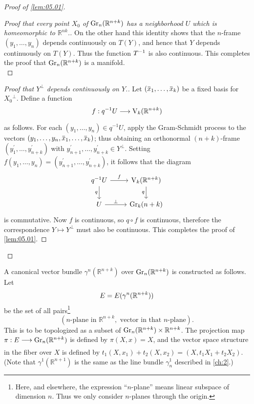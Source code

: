 \documentclass[../main]{subfiles}
\begin{document}
\begin{proof}[Proof of \ref{lem:05.01}]
\begin{proof}[Proof that every point $X_{0}$ of $\operatorname{Gr}_n (\mathbb{R}^{n+k})$ has a neighborhood $U$ which is homeomorphic to $\mathbb{R}^{nk}$.]
On the other hand this identity shows that the $n$-frame $(y_1,\dots, y_n) $
depends continuously on $T(Y)$, and hence that $Y$ depends continuously
on $T(Y)$. Thus the function $T^{-1}$ is also continuous. This completes
the proof that $\operatorname{Gr}_n (\mathbb{R}^{n+k})$ is a manifold.\\
\end{proof}
\begin{proof}[Proof that $Y^\perp$ depends continuously on $Y$.]
Let $(\xoverline{x}_1,\dots,\xoverline{x}_k)$ be a fixed basis for $X_{0}{ }^{\perp}$. Define a function
\[f:q\inv U \varrightarrow{}\StiefelManifold_k(\mathbb{R}^{n+k})\]
as follows. For each $(y_{1}, \dots, y_{n}) \in q^{-1} U$, apply the Gram-Schmidt process to the vectors $(y_{1}, \dots, y_{n}, \xoverline{x}_{1}, \dots, \xoverline{x}_{k})$; thus obtaining an orthonormal $(n+k)$-frame $(y_{1}^{\prime}, \dots, y_{n+k}^{\prime})$ with $y_{n+1}^{\prime}, \dots, y_{n+k}^{\prime} \in Y^{\perp}$. Setting $f(y_{1}, \dots, y_{n})=(y_{n+1}^{\prime}, \dots, y_{n+k}^{\prime})$, it follows that the diagram
\[\begin{tikzcd}
	q\inv U \arrow[r, "f"] \arrow[d, "q"'] & \StiefelManifold_k(\mathbb{R}^{n+k}) \arrow[d, "q"'] \\
	U \arrow[r, "\perp"]                   & \grassmannian_{k}(n+k)                    
\end{tikzcd}\]
is commutative. Now $f$ is continuous, so $q \circ f$ is continuous, therefore the correspondence $Y \mapsto Y^{\perp}$ must also be continuous. This completes the proof of \ref{lem:05.01}.
\end{proof}
\end{proof}
A canonical vector bundle $\gamma^n(\mathbb{R}^{n+k})$ over $\operatorname{Gr}_n (\mathbb{R}^{n+k})$ is constructed
as follows. Let
\[E=E(\gamma^n(\mathbb{R}^{n+k}))\]
be the set of all pairs\footnote{Here, and elsewhere, the expression ``$n$-plane'' means linear subspace of
	dimension $n$. Thus we only consider $n$-planes through the origin.}
\[
 (\text {$n$-plane in } \mathbb{R}^{n+k}, \text { vector in that $n$-plane}). 
\]
This is to be topologized as a subset of $\operatorname{Gr}_n (\mathbb{R}^{n+k})\times \mathbb{R}^{n+k}$. The projection map $\pi:\total\varrightarrow{} \grassmannian_n (\mathbb{R}^{n+k})$ is defined by $\pi(X, x)=X$, and the vector space structure in the fiber over $X$ is defined by $t_{1}(X, x_{1})+t_{2}(X, x_{2})= (X, t_{1} X_{1}+t_{2} X_{2}) .$ (Note that $\gamma^{1}(\mathbb{R}^{n+1})$ is the same as the line bundle $\gamma_{n}^{1}$ described in \ref{ch:2}.)
\end{document}
